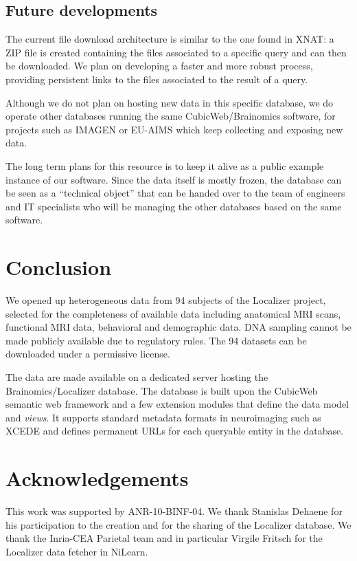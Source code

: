 \documentclass[preprint,12pt]{elsarticle}
\begin{document}
\subsection{Future developments}

The current file download architecture is similar to the one found in XNAT: a ZIP file is created containing the files associated to a specific query and can then be downloaded. We plan on developing a faster and more robust process, providing persistent links to the files associated to the result of a query.

Although we do not plan on hosting new data in this specific database, we do operate other databases running the same CubicWeb/Brainomics software, for projects such as IMAGEN \cite{Imagen2010} or EU-AIMS \cite{Aims2014} which keep collecting and exposing new data.

The long term plans for this resource is to keep it alive as a public example instance of our software. Since the data itself is mostly frozen, the database can be seen as a ``technical object'' that can be handed over to the team of engineers and IT specialists who will be managing the other databases based on the same software.


\section{Conclusion}

We opened up heterogeneous data from 94 subjects of the Localizer project, selected for the completeness of available data including anatomical MRI scans, functional MRI data, behavioral and demographic data. DNA sampling cannot be made publicly available due to regulatory rules. The 94 datasets can be downloaded under a permissive license.

The data are made available on a dedicated server hosting the Brainomics/Localizer database. The database is built upon the CubicWeb semantic web framework and a few extension modules that define the data model and \emph{views}. It supports standard metadata formats in neuroimaging such as XCEDE and defines permanent URLs for each queryable entity in the database.


\section{Acknowledgements}

This work was supported by ANR-10-BINF-04. We thank Stanislas Dehaene for his participation to the creation and for the sharing of the Localizer database. We thank the Inria-CEA Parietal team and in particular Virgile Fritsch for the Localizer data fetcher in NiLearn.
\end{document}
